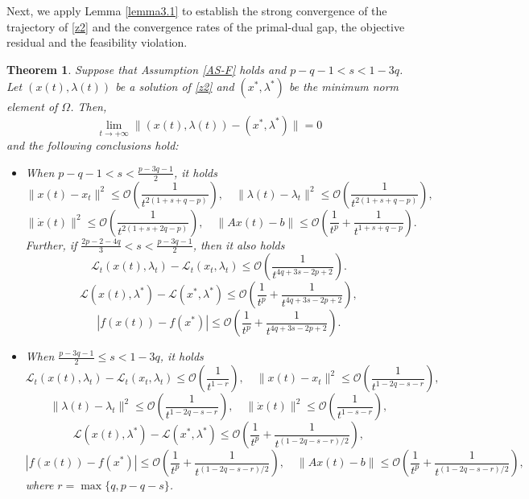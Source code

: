 \documentclass[review]{elsarticle}
\newtheorem{theorem}{Theorem}[section]
\begin{document}
Next, we apply Lemma \ref{lemma3.1} to establish the strong convergence of the trajectory of \eqref{z2}  and the convergence rates of the primal-dual gap, the objective residual and the feasibility violation.
	
\begin{theorem}\label{ztt3.1}
	Suppose that Assumption \ref{AS-F} holds and  $p-q-1<s<1-3q$. Let $(x(t),\lambda(t))$ be a solution of \eqref{z2} and $(x^*,\lambda^*)$ be the minimum norm element of  $\Omega$. Then, 
$$\lim_{t\rightarrow+\infty}\|(x(t), \lambda(t))-(x^*,\lambda^*)\|=0$$ and  the following conclusions hold:
		\begin{itemize}
			\item[(i)] When $p-q-1<s<\frac{p-3q-1}{2}$, it holds
			$$\|x(t)-x_t\|^2\leq\mathcal{O}\left(\frac{1}{t^{2(1+s+q-p)}}\right), \quad \|\lambda(t)-\lambda_t\|^2\leq\mathcal{O}\left(\frac{1}{t^{2(1+s+q-p)}}\right),$$ $$\|\dot{x}(t)\|^2\leq\mathcal{O}\left(\frac{1}{t^{2(1+s+2q-p)}}\right),\quad 	\|Ax(t)-b\|\leq\mathcal{O}\left(\frac{1}{t^{p}}+\frac{1}{t^{1+s+q-p}}\right).$$
			Further, if $\frac{2p-2-4q}{3}<s<\frac{p-3q-1}{2}$, then it also holds
			$$\mathcal{L}_{t}(x(t),\lambda_t)-\mathcal{L}_{t}(x_t,\lambda_t)\leq\mathcal{O}\left(\frac{1}{t^{4q+3s-2p+2}}\right).$$
			$$\mathcal{L}(x(t),\lambda^*)-\mathcal{L}(x^*,\lambda^*)\leq\mathcal{O}\left(\frac{1}{t^{p}}+\frac{1}{t^{4q+3s-2p+2}}\right),$$ $$|f(x(t))-f(x^*)|\leq\mathcal{O}\left(\frac{1}{t^{p}}+\frac{1}{t^{4q+3s-2p+2}}\right).$$

			\item[(ii)] When $\frac{p-3q-1}{2}\leq s<1-3q$, it holds
			$$\mathcal{L}_{t}(x(t),\lambda_t)-\mathcal{L}_{t}(x_t,\lambda_t)\leq\mathcal{O}\left(\frac{1}{t^{1-r}}\right), \quad \|x(t)-x_t\|^2\leq\mathcal{O}\left(\frac{1}{t^{1-2q-s-r}}\right),$$ $$\|\lambda(t)-\lambda_t\|^2\leq\mathcal{O}\left(\frac{1}{t^{1-2q-s-r}}\right), \quad \|\dot{x}(t)\|^2\leq\mathcal{O}\left(\frac{1}{t^{1-s-r}}\right),$$
			$$\mathcal{L}(x(t),\lambda^*)-\mathcal{L}(x^*,\lambda^*)\leq\mathcal{O}\left(\frac{1}{t^{p}}+\frac{1}{t^{(1-2q-s-r)/2}}\right),$$
			$$|f(x(t))-f(x^*)|\leq\mathcal{O}\left(\frac{1}{t^{p}}+\frac{1}{t^{(1-2q-s-r)/2}}\right), \quad \|Ax(t)-b\|\leq\mathcal{O}\left(\frac{1}{t^{p}}+\frac{1}{t^{(1-2q-s-r)/2}}\right),$$
			where $r=\max\{q, p-q-s\}$.
			
		\end{itemize}
\end{theorem} 
\end{document}
